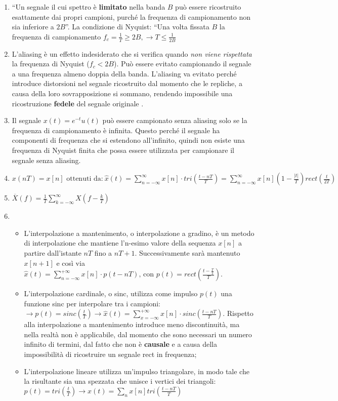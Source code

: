 \documentclass[
]{article}
\begin{document}
\begin{enumerate}
\def\labelenumi{\arabic{enumi}.}
\setcounter{enumi}{13}
\item
  ``Un segnale il cui spettro è \textbf{limitato} nella banda \(B\) può
  essere ricostruito esattamente dai propri campioni, purché la
  frequenza di campionamento non sia inferiore a \(2B\)''. La condizione
  di Nyquist: ``Una volta fissata \(B\) la frequenza di campionamento
  \(f_c = \frac{1}{T} \geq 2B, \to T \leq \frac{1}{2B}\)
\item
  L'aliasing è un effetto indesiderato che si verifica quando \emph{non
  viene rispettata} la frequenza di Nyquist (\(f_c < 2B\)). Può essere
  evitato campionando il segnale a una frequenza almeno doppia della
  banda. L'aliasing va evitato perché introduce distorsioni nel segnale
  ricostruito dal momento che le repliche, a causa della loro
  sovrapposizione si sommano, rendendo impossibile una ricostruzione
  \textbf{fedele} del segnale originale .
\item
  Il segnale \(x(t)=e^{-t}u(t)\) può essere campionato senza aliasing
  solo se la frequenza di campionamento è infinita. Questo perché il
  segnale ha componenti di frequenza che si estendono all'infinito,
  quindi non esiste una frequenza di Nyquist finita che possa essere
  utilizzata per campionare il segnale senza aliasing.
\item
  \(\displaystyle x(nT) = x[n] \text{ ottenuti da:} \ \hat{x}(t)= \sum_{n= -\infty}^{\infty} x[n] \cdot tri(\frac{t-nT}{T})= \sum_{n= -\infty}^{\infty}x[n] (1-\frac{|t|}{T})rect(\frac{t}{2T})\)
\item
  \(\overline{X}(f) = \frac{1}{T}\sum_{k=-\infty}^{\infty}X(f-\frac{k}{T})\)
\item
  \begin{itemize}
  \item
    L'interpolazione a mantenimento, o interpolazione a gradino, è un
    metodo di interpolazione che mantiene l'n-esimo valore della
    sequenza \(x[n]\) a partire dall'istante \(nT\) fino a \(nT+1\).
    Successivamente sarà mantenuto \(x[n+1]\) e così via\\
    \(\hat{x}(t)=\sum_{n=-\infty}^{+\infty}x[n]\cdot p(t-nT)\text{, con } p(t)= rect(\frac{t-\frac{T}{2}}{T})\).
  \item
    L'interpolazione cardinale, o sinc, utilizza come impulso \(p(t)\)
    una funzione sinc per interpolare tra i campioni:
    \(\to p(t)=sinc(\frac{t}{T}) \to \hat{x}(t)=\sum_{x=-\infty}^{+\infty} x[n]\cdot sinc(\frac{t-nT}{T})\).
    Rispetto alla interpolazione a mantenimento introduce meno
    discontinuità, ma nella realtà non è applicabile, dal momento che
    sono necessari un numero infinito di termini, dal fatto che non è
    \textbf{causale} e a causa della impossibilità di ricostruire un
    segnale rect in frequenza;
  \item
    L'interpolazione lineare utilizza un'impulso triangolare, in modo
    tale che la risultante sia una spezzata che unisce i vertici dei
    triangoli:
    \(p(t) = tri(\frac{t}{T}) \to \hat{x}(t) = \sum_n x[n]tri(\frac{t-nT}{T})\)


\end{itemize}
\end{enumerate}
\end{document}
